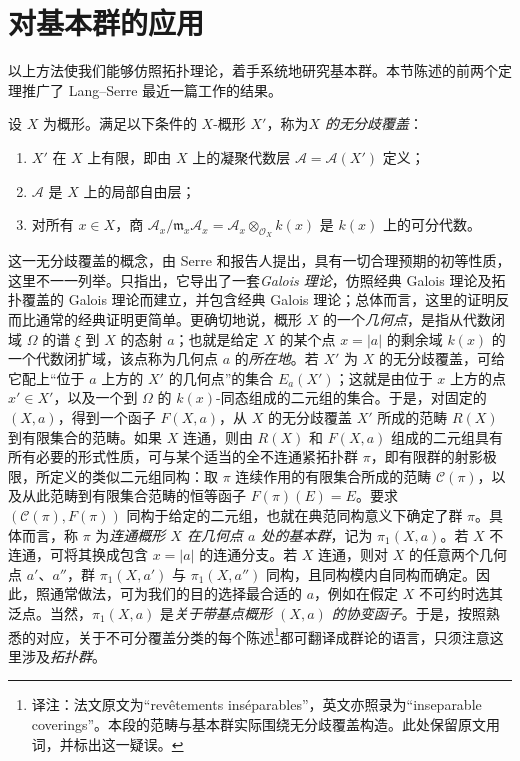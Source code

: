 \chapter{对基本群的应用}\thispagestyle{fancy}\label{fga2-8}
\par{}以上方法使我们能够仿照拓扑理论，着手系统地研究基本群。本节陈述的前两个定理推广了 Lang–Serre 最近一篇工作的结果。
\par{}设 \(X\) 为概形。满足以下条件的 \(X\)-概形 \(X'\)，称为\emph{\(X\) 的无分歧覆盖}：
\begin{enumerate}
    
 \item[i.]\(X'\) 在 \(X\) 上有限，即由 \(X\) 上的凝聚代数层 \(\mathscr {A}=\mathscr {A}(X')\) 定义；

    
 \item[ii.]\(\mathscr {A}\) 是 \(X\) 上的局部自由层；

    
 \item[iii.]对所有 \(x\in  X\)，商 \(\mathscr {A}_x/\mathfrak {m}_x\mathscr {A}_x = \mathscr {A}_x\otimes _{\mathcal {O}_X}k(x)\) 是 \(k(x)\) 上的可分代数。

  \end{enumerate} 这一无分歧覆盖的概念，由 Serre 和报告人提出，具有一切合理预期的初等性质，这里不一一列举。只指出，它导出了一套\emph{Galois 理论}，仿照经典 Galois 理论及拓扑覆盖的 Galois 理论而建立，并包含经典 Galois 理论；总体而言，这里的证明反而比通常的经典证明更简单。更确切地说，概形 \(X\) 的一个\emph{几何点}，是指从代数闭域 \(\Omega \) 的谱 \(\xi \) 到 \(X\) 的态射 \(a\)；也就是给定 \(X\) 的某个点 \(x=|a|\) 的剩余域 \(k(x)\) 的一个代数闭扩域，该点称为几何点 \(a\) 的\emph{所在地}。若 \(X'\) 为 \(X\) 的无分歧覆盖，可给它配上“位于 \(a\) 上方的 \(X'\) 的几何点”的集合 \(E_a(X')\)；这就是由位于 \(x\) 上方的点 \(x'\in  X'\)，以及一个到 \(\Omega \) 的 \(k(x)\)-同态组成的二元组的集合。于是，对固定的 \((X,a)\)，得到一个函子 \(F(X,a)\)，从 \(X\) 的无分歧覆盖 \(X'\) 所成的范畴 \(R(X)\) 到有限集合的范畴。如果 \(X\) 连通，则由 \(R(X)\) 和 \(F(X,a)\) 组成的二元组具有所有必要的形式性质，可与某个适当的全不连通紧拓扑群 \(\pi \)，即有限群的射影极限，所定义的类似二元组同构：取 \(\pi \) 连续作用的有限集合所成的范畴 \(\mathcal {C}(\pi )\)，以及从此范畴到有限集合范畴的恒等函子 \(F(\pi )(E)=E\)。要求 \((\mathcal {C}(\pi ),F(\pi ))\) 同构于给定的二元组，也就在典范同构意义下确定了群 \(\pi \)。具体而言，称 \(\pi \) 为\emph{连通概形 \(X\) 在几何点 \(a\) 处的基本群}，记为 \(\pi _1(X,a)\)。若 \(X\) 不连通，可将其换成包含 \(x=|a|\) 的连通分支。若 \(X\) 连通，则对 \(X\) 的任意两个几何点 \(a'\)、\(a''\)，群 \(\pi _1(X,a')\) 与 \(\pi _1(X,a'')\) 同构，且同构模内自同构而确定。因此，照通常做法，可为我们的目的选择最合适的 \(a\)，例如在假定 \(X\) 不可约时选其泛点。当然，\(\pi _1(X,a)\) 是\emph{关于带基点概形 \((X,a)\) 的协变函子}。于是，按照熟悉的对应，关于不可分覆盖分类的每个陈述\footnote{译注：法文原文为“revêtements inséparables”，英文亦照录为“inseparable coverings”。本段的范畴与基本群实际围绕无分歧覆盖构造。此处保留原文用词，并标出这一疑误。}都可翻译成群论的语言，只须注意这里涉及\emph{拓扑群}。
